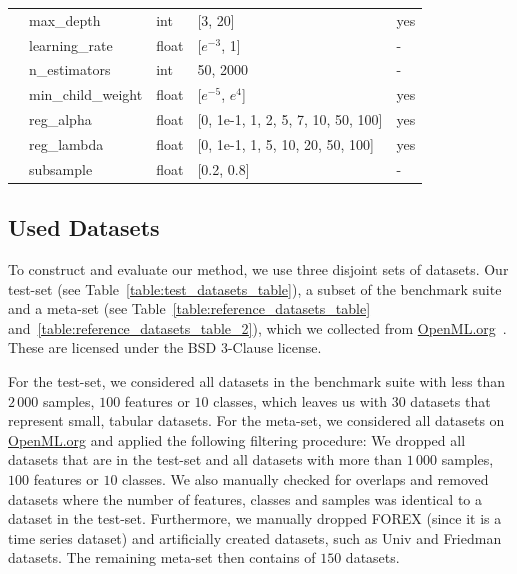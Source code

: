 \documentclass{article}
\begin{document}
\begin{table}[htbp]
\begin{tabular}{lllll}
    & max\_depth & int & [3, 20] & yes \\
    & learning\_rate & float & [$e^{-3}$, 1] & - \\
    & n\_estimators & int & 50, 2000 & - \\
    & min\_child\_weight & float & [$e^{-5}$, $e^4$] & yes \\
    & reg\_alpha & float & [0, 1e-1, 1, 2, 5, 7, 10, 50, 100] & yes \\
    & reg\_lambda & float & [0, 1e-1, 1, 5, 10, 20, 50, 100] & yes \\
    & subsample & float & [0.2, 0.8] & - \\
\bottomrule
\end{tabular}
\end{table}
\subsection{Used Datasets}\label{app:ssec:datasets}

To construct and evaluate our method, we use three disjoint sets of datasets. Our test-set (see Table~\ref{table:test_datasets_table}), a subset of the \openmlcc{} benchmark suite~\citep{bischl-neuripsdbt21a} and a meta-set (see Table~\ref{table:reference_datasets_table} and~\ref{table:reference_datasets_table_2}), which we collected from \url{OpenML.org}~\citep{vanschoren-sigkdd14a}. These are licensed under the BSD 3-Clause license.

For the test-set, we considered all datasets in the \openmlcc{} benchmark suite with less than $2\,000$ samples, $100$ features or $10$ classes, which leaves us with $30$ datasets that represent small, tabular datasets.
%
For the meta-set, we considered all datasets on \url{OpenML.org} and applied the following filtering procedure: We dropped all datasets that are in the test-set and all datasets with more than $1\,000$ samples, $100$ features or $10$ classes. We also manually checked for overlaps and removed datasets where the number of features, classes and samples was identical to a dataset in the test-set. Furthermore, we manually dropped FOREX (since it is a time series dataset) and artificially created datasets, such as Univ and Friedman datasets. The remaining meta-set then contains of $150$ datasets.

\end{document}
